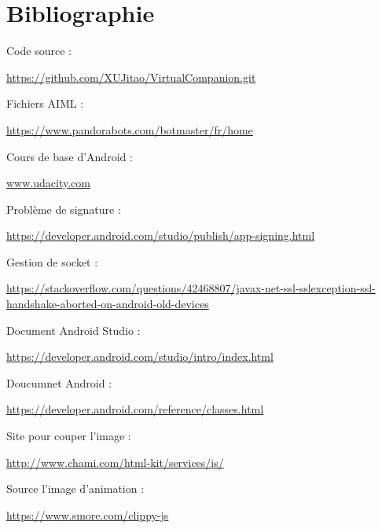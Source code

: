 \section*{Bibliographie}

Code source : \begin{scriptsize}\url{https://github.com/XUJitao/VirtualCompanion.git}\end{scriptsize}

Fichiers AIML : \begin{scriptsize}\url{https://www.pandorabots.com/botmaster/fr/home}\end{scriptsize}

Cours de base d'Android : \begin{scriptsize}\url{www.udacity.com}\end{scriptsize}

Problème de signature : \begin{scriptsize}\url{https://developer.android.com/studio/publish/app-signing.html}\end{scriptsize}

Gestion de socket : \begin{tiny}\url{https://stackoverflow.com/questions/42468807/javax-net-ssl-sslexception-ssl-handshake-aborted-on-android-old-devices}\end{tiny}

Document Android Studio : \begin{scriptsize}\url{https://developer.android.com/studio/intro/index.html}\end{scriptsize}

Doucumnet Android : \begin{scriptsize}\url{https://developer.android.com/reference/classes.html}\end{scriptsize}

Site pour couper l'image : \begin{scriptsize}\url{http://www.chami.com/html-kit/services/is/}\end{scriptsize}

Source l'image d'animation : \begin{scriptsize}\url{https://www.smore.com/clippy-js}\end{scriptsize}


\newpage

